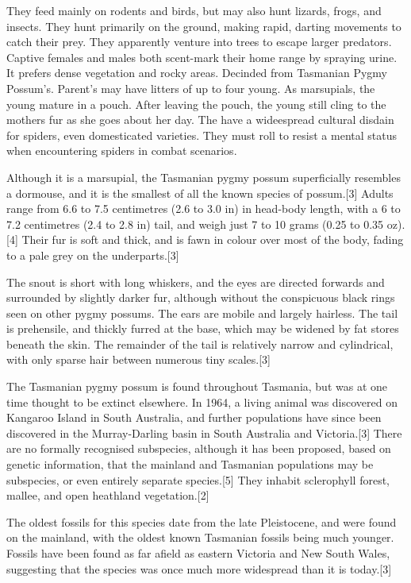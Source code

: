 \documentclass[twoside, 12pt, letterpaper]{report}\usepackage[]{graphicx}\usepackage[]{color}
\begin{document}
\begin{multicols*}{2}
They feed mainly on rodents and birds, but may also hunt lizards, frogs, and insects. They hunt primarily on the ground, making rapid, darting movements to catch their prey. They apparently venture into trees to escape larger predators. Captive females and males both scent-mark their home range by spraying urine. It prefers dense vegetation and rocky areas.
\nsubsection{\possum}
Decinded from Tasmanian Pygmy Possum's. Parent's may have litters of up to four young. As marsupials, the young mature in a pouch. After leaving the pouch, the young still cling to the mothers fur as she goes about her day. The \possum have a wideespread cultural disdain for spiders, even domesticated varieties. They must roll to resist a mental status when encountering spiders in combat scenarios.

Although it is a marsupial, the Tasmanian pygmy possum superficially resembles a dormouse, and it is the smallest of all the known species of possum.[3] Adults range from 6.6 to 7.5 centimetres (2.6 to 3.0 in) in head-body length, with a 6 to 7.2 centimetres (2.4 to 2.8 in) tail, and weigh just 7 to 10 grams (0.25 to 0.35 oz).[4] Their fur is soft and thick, and is fawn in colour over most of the body, fading to a pale grey on the underparts.[3]

The snout is short with long whiskers, and the eyes are directed forwards and surrounded by slightly darker fur, although without the conspicuous black rings seen on other pygmy possums. The ears are mobile and largely hairless. The tail is prehensile, and thickly furred at the base, which may be widened by fat stores beneath the skin. The remainder of the tail is relatively narrow and cylindrical, with only sparse hair between numerous tiny scales.[3]

The Tasmanian pygmy possum is found throughout Tasmania, but was at one time thought to be extinct elsewhere. In 1964, a living animal was discovered on Kangaroo Island in South Australia, and further populations have since been discovered in the Murray-Darling basin in South Australia and Victoria.[3] There are no formally recognised subspecies, although it has been proposed, based on genetic information, that the mainland and Tasmanian populations may be subspecies, or even entirely separate species.[5] They inhabit sclerophyll forest, mallee, and open heathland vegetation.[2]

The oldest fossils for this species date from the late Pleistocene, and were found on the mainland, with the oldest known Tasmanian fossils being much younger. Fossils have been found as far afield as eastern Victoria and New South Wales, suggesting that the species was once much more widespread than it is today.[3]


\end{multicols*}
\end{document}
